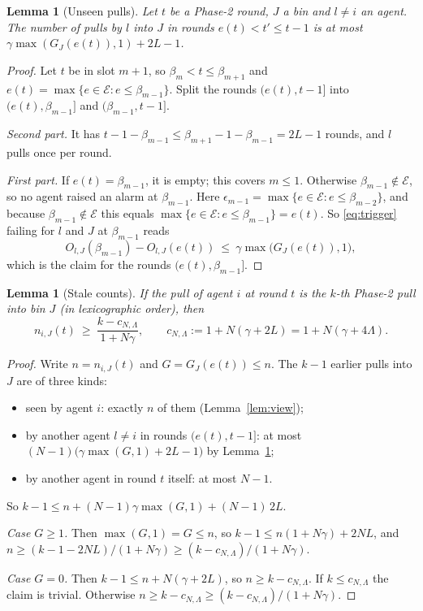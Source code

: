 \documentclass[11pt]{article}
\newtheorem{lemma}[theorem]{Lemma}
\theoremstyle{definition}
\newcommand{\cE}{\mathcal{E}}
\begin{document}
\begin{lemma}[Unseen pulls]\label{lem:unseen}
Let $t$ be a Phase-2 round, $J$ a bin and $l\neq i$ an agent. The number of pulls by $l$ into $J$ in rounds
$e(t)<t'\le t-1$ is at most $\gamma\max(G_J(e(t)),1)+2L-1$.
\end{lemma}
\begin{proof}
Let $t$ be in slot $m+1$, so $\beta_m<t\le\beta_{m+1}$ and $e(t)=\max\{e\in\cE:e\le\beta_{m-1}\}$. Split the rounds
$(e(t),t-1]$ into $(e(t),\beta_{m-1}]$ and $(\beta_{m-1},t-1]$.

\emph{Second part.} It has $t-1-\beta_{m-1}\le\beta_{m+1}-1-\beta_{m-1}=2L-1$ rounds, and $l$ pulls once per round.

\emph{First part.} If $e(t)=\beta_{m-1}$, it is empty; this covers $m\le1$. Otherwise $\beta_{m-1}\notin\cE$, so no
agent raised an alarm at $\beta_{m-1}$. Here $\epsilon_{m-1}=\max\{e\in\cE:e\le\beta_{m-2}\}$, and because
$\beta_{m-1}\notin\cE$ this equals $\max\{e\in\cE:e\le\beta_{m-1}\}=e(t)$. So \eqref{eq:trigger} failing for $l$ and
$J$ at $\beta_{m-1}$ reads
\[
O_{l,J}(\beta_{m-1})-O_{l,J}(e(t))\ \le\ \gamma\max\big(G_J(e(t)),1\big),
\]
which is the claim for the rounds $(e(t),\beta_{m-1}]$.
\end{proof}

\begin{lemma}[Stale counts]\label{lem:stale}
If the pull of agent $i$ at round $t$ is the $k$-th Phase-2 pull into bin $J$ (in lexicographic order), then
\[
n_{i,J}(t)\ \ge\ \frac{k-c_{N,\Lambda}}{1+N\gamma},\qquad c_{N,\Lambda}:=1+N(\gamma+2L)=1+N(\gamma+4\Lambda).
\]
\end{lemma}
\begin{proof}
Write $n=n_{i,J}(t)$ and $G=G_J(e(t))\le n$. The $k-1$ earlier pulls into $J$ are of three kinds:
\begin{itemize}[nosep]
\item seen by agent $i$: exactly $n$ of them (Lemma~\ref{lem:view});
\item by another agent $l\neq i$ in rounds $(e(t),t-1]$: at most $(N-1)\big(\gamma\max(G,1)+2L-1\big)$ by Lemma~\ref{lem:unseen};
\item by another agent in round $t$ itself: at most $N-1$.
\end{itemize}
So $k-1\le n+(N-1)\gamma\max(G,1)+(N-1)\,2L$.

\emph{Case $G\ge1$.} Then $\max(G,1)=G\le n$, so $k-1\le n(1+N\gamma)+2NL$, and
$n\ge(k-1-2NL)/(1+N\gamma)\ge(k-c_{N,\Lambda})/(1+N\gamma)$.

\emph{Case $G=0$.} Then $k-1\le n+N(\gamma+2L)$, so $n\ge k-c_{N,\Lambda}$. If $k\le c_{N,\Lambda}$ the claim is trivial.
Otherwise $n\ge k-c_{N,\Lambda}\ge(k-c_{N,\Lambda})/(1+N\gamma)$.
\end{proof}
\end{document}
